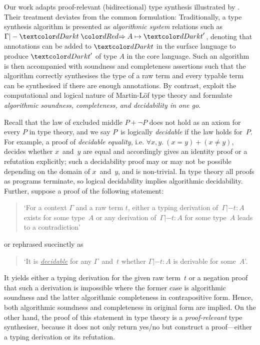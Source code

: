 Our work adapts proof-relevant (bidirectional) type synthesis illustrated by \citet{Wadler2022}.
Their treatment deviates from the common formulation: 
Traditionally, a type synthesis algorithm is presented as \emph{algorithmic system} relations such as $\Gamma |- \isTerm{t} \syn A \mapsto \isTerm{t}'$, denoting that annotations can be added to $\isTerm{t}$ in the surface language to produce $\isTerm{t}'$ of type $A$ in the core language.
Such an algorithm is then accompanied with soundness and completeness assertions such that the algorithm correctly synthesises the type of a raw term and every typable term can be synthesised if there are enough annotations.
By contrast, \citeauthor{Wadler2022} exploit the computational and logical nature of Martin-L\"of type theory and formulate \emph{algorithmic soundness, completeness, and decidability in one go}.

Recall that the law of excluded middle $P + \neg P$ does not hold as an axiom for every $P$ in type theory, and we say $P$~is logically \emph{decidable} if the law holds for~$P$.
For example, a proof of \emph{decidable equality}, i.e. $\forall x, y.~(x = y) + (x \neq y)$, decides whether $x$~and~$y$ are equal and accordingly gives an identity proof or a refutation explicitly; such a decidability proof may or may not be possible depending on the domain of $x$~and~$y$, and is non-trivial.
In type theory all proofs as programs terminate, so logical decidability implies algorithmic decidability.
Further, suppose a proof of the following statement:
\begin{quote}
  `For a context $\Gamma$ and a raw term $t$, either a typing derivation of\, $\Gamma |- t : A$ exists for some type~$A$ or any derivation of\, $\Gamma |- t : A$ for some type~$A$ leads to a contradiction'
\end{quote}
or rephrased succinctly as 
\begin{quote}
  `It is \underline{\emph{decidable}} for any $\Gamma$~and~$t$ whether $\Gamma |- t : A$ is derivable for some~$A$'.
\end{quote}
It yields either a typing derivation for the given raw term~$t$ or a negation proof that such a derivation is impossible where the former case is algorithmic soundness and the latter algorithmic completeness in contrapositive form.
Hence, both algorithmic soundness and completeness in original form are implied.
On the other hand, the proof of this statement in type theory is a \emph{proof-relevant} type synthesiser, because it does not only return yes/no but construct a proof---either a typing derivation or its refutation. 

